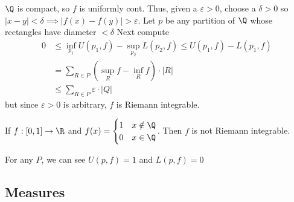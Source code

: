 \begin{solution}
	$\Q$ is compact, so  $f$ is uniformly cont. Thus, given a $\varepsilon >0 $, choose a $\delta >0$ so  $|x-y| < \delta \implies |f(x) - f(y)| > \varepsilon$. Let $p$ be any partition of  $\Q$ whose rectangles have diameter  $< \delta$ \newline
	Next compute
	\begin{align*}
		0 &\leq \inf_{p_1} U(p_1, f) - \sup_{p_2} L(p_2, f) \leq U(p_1, f) - L(p_1, f) \\
		  &= \sum_{R \in P}^{} \left( \sup_{R} f - \inf_{R}f \right) \cdot |R| \\
		  &\leq \sum_{R \in P}^{} \varepsilon \cdot |Q|
	\end{align*}
	but since $\varepsilon > 0$ is arbitrary,  $f$ is Riemann integrable.
\end{solution}

\begin{example}
	If $f:[0,1] \to \R$ and $f(x) =
	\begin{cases}
		1 & x\notin \Q \\
		0 & x\in \Q
	\end{cases}$.
	Then $f$ is not Riemann integrable.
	\begin{solution}
		For any $P$, we can see  $U(p,f) = 1$ and  $L(p,f) = 0$
	\end{solution}
\end{example}

\subsection{Measures}

